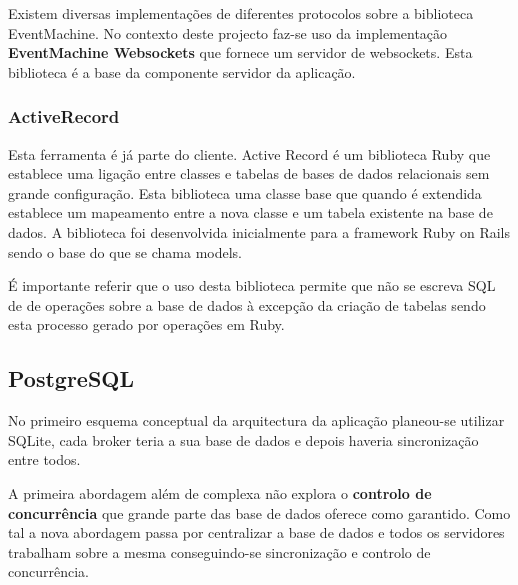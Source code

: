 Existem diversas implementações de diferentes protocolos sobre a biblioteca EventMachine. No contexto deste projecto faz-se uso da implementação \textbf{EventMachine Websockets} que fornece um servidor de websockets. Esta biblioteca é a base da componente servidor da aplicação.

\subsubsection{ActiveRecord}
Esta ferramenta é já parte do cliente.
Active Record é um biblioteca Ruby que establece uma ligação entre classes e tabelas de bases de dados relacionais sem grande configuração. Esta biblioteca uma classe base que quando é extendida establece um mapeamento entre a nova classe e um tabela existente na base de dados. A biblioteca foi desenvolvida inicialmente para a framework Ruby on Rails sendo o base do que se chama models.

É importante referir que o uso desta biblioteca permite que não se escreva SQL de de operações sobre a base de dados à excepção da criação de tabelas sendo esta processo gerado por operações em Ruby.

\subsection{PostgreSQL}

No primeiro esquema conceptual da arquitectura da aplicação planeou-se utilizar SQLite, cada broker teria a sua base de dados e depois haveria sincronização entre todos.

A primeira abordagem além de complexa não explora o \textbf{controlo de concurrência} que grande parte das base de dados oferece como garantido. Como tal a nova abordagem passa por centralizar a base de dados e todos os servidores trabalham sobre a mesma conseguindo-se sincronização e controlo de concurrência.


